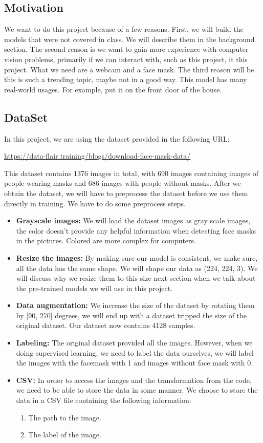 \documentclass{article}
\begin{document}
\subsection{Motivation}
We want to do this project because of a few reasons. First, we will build the models that were not covered in class. We will describe them in the background section. The second reason is we want to gain more experience with computer vision problems, primarily if we can interact with, such as this project, it this project. What we need are a webcam and a face mask. The third reason will be this is such a trending topic, maybe not in a good way. This model has many real-world usages. For example, put it on the front door of the house. 

\subsection{DataSet}
In this project, we are using the dataset provided in the following URL:
\begin{center}
\url{https://data-flair.training/blogs/download-face-mask-data/}
\end{center}
This dataset contains 1376 images in total, with 690 images containing images of people wearing masks and 686 images with people without masks. After we obtain the dataset, we will have to preprocess the dataset before we use them directly in training. We have to do some preprocess steps.\\
\begin{itemize}
\item \textbf{Grayscale images: }We will load the dataset images as gray scale images, the color doesn't provide any helpful information when detecting face masks in the pictures. Colored are more complex for computers.
\item \textbf{Resize the images: }By making sure our model is consistent, we make sure, all the data has the same shape. We will shape our data as (224, 224, 3). We will discuss why we resize them to this size next section when we talk about the pre-trained models we will use in this project.
\item \textbf{Data augmentation: }We increase the size of the dataset by rotating them by [90, 270] degrees, we will end up with a dataset tripped the size of the original dataset. Our dataset now contains 4128 samples.
\item \textbf{Labeling: }The original dataset provided all the images. However, when we doing supervised learning, we need to label the data ourselves, we will label the images with the facemask with 1 and images without face mask with 0.
\item\textbf{CSV: }In order to access the images and the transformation from the code, we need to be able to store the data in some manner. We choose to store the data in a CSV file containing the following information:
	\begin{enumerate}
	\item The path to the image.
	\item The label of the image.
	\end{enumerate}
\end{itemize}
\end{document}
